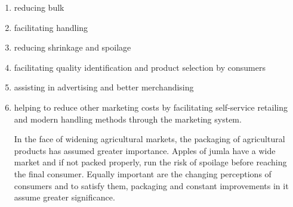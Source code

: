 \documentclass[11pt,]{book}
\providecommand{\tightlist}{%
  \setlength{\itemsep}{0pt}\setlength{\parskip}{0pt}}
\theoremstyle{definition}
\theoremstyle{definition}
\theoremstyle{definition}
\theoremstyle{remark}
\begin{document}
\begin{enumerate}
\def\labelenumi{\arabic{enumi}.}
\tightlist
\item
  reducing bulk
\item
  facilitating handling
\item
  reducing shrinkage and spoilage
\item
  facilitating quality identification and product selection by consumers
\item
  assisting in advertising and better merchandising
\item
  helping to reduce other marketing costs by facilitating self-service
  retailing and modern handling methods through the marketing system.
  \par
  In the face of widening agricultural markets, the packaging of
  agricultural products has assumed greater importance. Apples of jumla
  have a wide market and if not packed properly, run the risk of
  spoilage before reaching the final consumer. Equally important are the
  changing perceptions of consumers and to satisfy them, packaging and
  constant improvements in it assume greater significance.
\end{enumerate}
\end{document}
